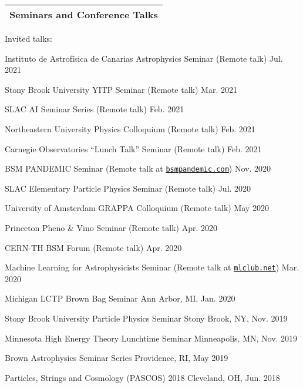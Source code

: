 \documentclass[11pt]{article}
\newenvironment{packed_itemize}{
\begin{itemize}[label=\raisebox{0.25ex}{\tiny$\bullet$}]
  \setlength{\itemsep}{3pt}
  \setlength{\parskip}{0pt}
  \setlength{\parsep}{0pt}}{\end{itemize}
}
\begin{document}


\noindent
\begin{tabular*}{\textwidth}{l@{\extracolsep{\fill}}}
\large {\sc \Large{Seminars and Conference Talks}}\\
\hline
\end{tabular*}\vspace{3.5mm}

\noindent
Invited talks:
\begin{packed_itemize}
  \item Instituto de Astrof\'{i}sica de Canarias Astrophysics Seminar (Remote talk) \hfill Jul. 2021
  \item Stony Brook University YITP Seminar (Remote talk) \hfill Mar. 2021
  \item SLAC AI Seminar Series (Remote talk) \hfill Feb. 2021
  \item Northeastern University Physics Colloquium (Remote talk) \hfill Feb. 2021
  \item Carnegie Observatories ``Lunch Talk'' Seminar (Remote talk) \hfill Feb. 2021
  \item BSM PANDEMIC Seminar  (Remote talk at \href{https://www.bsmpandemic.com/ }{\texttt{bsmpandemic.com}}) \hfill Nov. 2020
  \item SLAC Elementary Particle Physics Seminar (Remote talk) \hfill Jul. 2020
  \item University of Amsterdam GRAPPA Colloquium (Remote talk) \hfill May 2020
  \item Princeton Pheno \& Vino Seminar (Remote talk) \hfill Apr. 2020
  \item CERN-TH BSM Forum (Remote talk) \hfill  Apr. 2020
  \item Machine Learning for Astrophysicists Seminar (Remote talk at \href{https://docs.google.com/document/d/1GGtE-YIuAWlmpKSr38_kyiF-Fklszhkh4FkiYWzBAho/pub}{\texttt{mlclub.net}}) \hfill  Mar. 2020
  \item Michigan LCTP Brown Bag Seminar \hfill Ann Arbor, MI, Jan. 2020
  \item Stony Brook University Particle Physics Seminar \hfill Stony Brook, NY, Nov. 2019
  \item Minnesota High Energy Theory Lunchtime Seminar \hfill  Minneapolis, MN, Nov. 2019
  \item Brown Astrophysics Seminar Series \hfill Providence, RI, May 2019
  \item Particles, Strings and Cosmology (PASCOS) 2018 \hfill Cleveland, OH, Jun. 2018

\end{packed_itemize}
\end{document}
